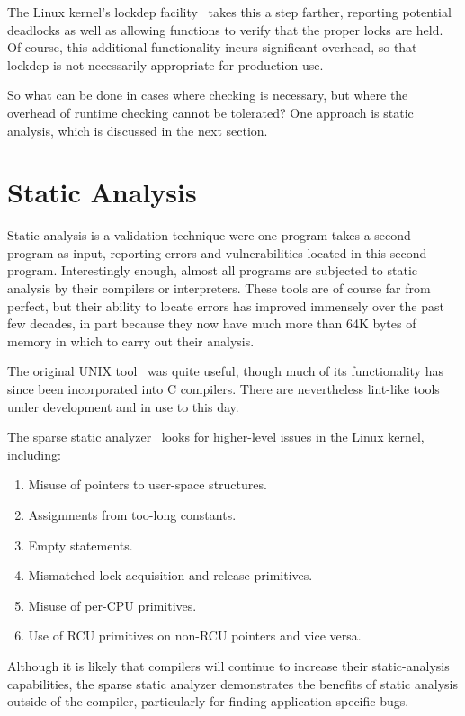 The Linux kernel's lockdep
facility~\cite{JonathanCorbet2006lockdep,StevenRostedt2011locdepCryptic}
takes this a step farther, reporting potential deadlocks as well as
allowing functions to verify that the proper locks are held.
Of course, this additional functionality incurs significant overhead,
so that lockdep is not necessarily appropriate for production use.

So what can be done in cases where checking is necessary, but where the
overhead of runtime checking cannot be tolerated?
One approach is static analysis, which is discussed in the next section.

\section{Static Analysis}
\label{sec:debugging:Static Analysis}

Static analysis is a validation technique were one program takes a second
program as input, reporting errors and vulnerabilities located in this
second program.
Interestingly enough, almost all programs are subjected to static analysis
by their compilers or interpreters.
These tools are of course far from perfect, but their ability to locate
errors has improved immensely over the past few decades, in part because
they now have much more than 64K bytes of memory in which to carry out their
analysis.

The original UNIX  tool~\cite{StephenJohnson1977lint} was
quite useful, though much of its functionality has since been incorporated
into C compilers.
There are nevertheless lint-like tools under development and in use to
this day.

The sparse static analyzer~\cite{JonathanCorbet2004sparse}
looks for higher-level issues in the Linux kernel, including:

\begin{enumerate}
\item	Misuse of pointers to user-space structures.
\item	Assignments from too-long constants.
\item	Empty  statements.
\item	Mismatched lock acquisition and release primitives.
\item	Misuse of per-CPU primitives.
\item	Use of RCU primitives on non-RCU pointers and vice versa.
\end{enumerate}

Although it is likely that compilers will continue to increase their
static-analysis capabilities, the sparse static analyzer demonstrates
the benefits of static analysis outside of the compiler, particularly
for finding application-specific bugs.


